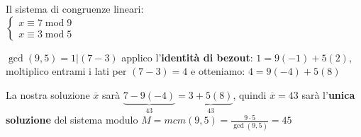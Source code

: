 \begin{flushleft}
\begin{boxA}
        {\centering
            \begin{minipage}[t]{0.45\textwidth}
                Il sistema di congruenze lineari: \\
                $\begin{cases}
                    x \equiv 7 \; \text{mod} \; 9 \\
                    x \equiv 3 \; \text{mod} \; 5
                \end{cases}$
            \end{minipage}
            \hfill
            \begin{minipage}[t]{0.45\textwidth}
                $\gcd (9, 5) = 1 | (7 - 3)$ applico l'\textbf{identità di bezout}: $1 = 9 (-1) + 5 (2)$, moltiplico entrami i lati per $(7 - 3) = 4$ e otteniamo: $4 = 9 (-4) + 5 (8)$
            \end{minipage}
        \par}
        La nostra soluzione $\overline{x}$ sarà $\underset{43}{\underbrace{7 - 9 (-4)}} = \underset{43}{\underbrace{3 + 5 (8)}}$, quindi $\overline{x} = 43$ sarà l'\textbf{unica soluzione} del sistema modulo $M = mcm(9, 5) = \frac{9 \cdot 5}{\gcd (9, 5)} = 45$ 
    \end{boxA}
\end{flushleft}

